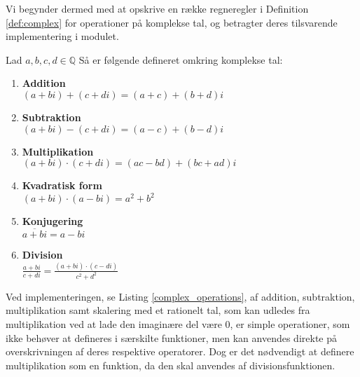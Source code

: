 Vi begynder dermed med at opskrive en række regneregler i Definition \ref{def:complex} for operationer på komplekse tal, og betragter deres tilsvarende implementering i modulet. 
\vspace{0.5cm}
\begin{definition}\label{def:complex}
  Lad $a, b, c, d \in \mathbb{Q}$ Så er følgende defineret omkring komplekse tal:
  \begin{enumerate}
    \item \textbf{Addition} \\ $(a + bi) + (c + di) = (a + c) + (b + d)i$
    \item \textbf{Subtraktion} \\ $(a + bi) - (c + di) = (a - c) + (b - d)i$
    \item \textbf{Multiplikation} \\ $(a + bi) \cdot (c + di) = (ac - bd) + (bc + ad)i$
    \item \textbf{Kvadratisk form} \\ $ (a + bi) \cdot (a - bi) = a^2 + b^2$
    \item \textbf{Konjugering} \\ $\overline{a + bi} = a - bi$
    \item \textbf{Division} \\ $\frac{a + bi}{c + di} = \frac{(a + bi)\cdot(c - di)}{c^2 + d^2}$
  \end{enumerate}
\end{definition}

Ved implementeringen, se Listing \ref{complex_operations}, af addition, subtraktion, multiplikation samt skalering med et rationelt tal, som kan udledes fra multiplikation ved at lade den imaginære del være $0$, er simple operationer, som ikke behøver at defineres i særskilte funktioner, men kan anvendes direkte på overskrivningen af deres respektive operatorer. Dog er det nødvendigt at definere multiplikation som en funktion, da den skal anvendes af divisionsfunktionen. 

